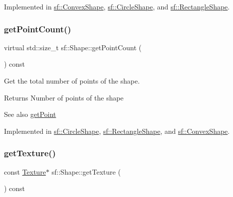 Implemented in \mbox{\hyperlink{classsf_1_1_convex_shape_a72a97bc426d8daf4d682a20fcb7f3fe7}{sf\+::\+Convex\+Shape}}, \mbox{\hyperlink{classsf_1_1_circle_shape_a2d7f9715502b960b92387102fddb8736}{sf\+::\+Circle\+Shape}}, and \mbox{\hyperlink{classsf_1_1_rectangle_shape_a3909f1a1946930ff5ae17c26206c0f81}{sf\+::\+Rectangle\+Shape}}.

\mbox{\label{classsf_1_1_shape_af988dd61a29803fc04d02198e44b5643}} 
\subsubsection{\texorpdfstring{getPointCount()}{getPointCount()}}
{\footnotesize\ttfamily virtual std\+::size\+\_\+t sf\+::\+Shape\+::get\+Point\+Count (\begin{DoxyParamCaption}{ }\end{DoxyParamCaption}) const\hspace{0.3cm}{\ttfamily [pure virtual]}}



Get the total number of points of the shape. 

\begin{DoxyReturn}{Returns}
Number of points of the shape
\end{DoxyReturn}
\begin{DoxySeeAlso}{See also}
\mbox{\hyperlink{classsf_1_1_shape_a40e5d83713eb9f0c999944cf96458085}{get\+Point}} \begin{DoxyVerb}\end{DoxyVerb}
 
\end{DoxySeeAlso}


Implemented in \mbox{\hyperlink{classsf_1_1_circle_shape_a014d29ec11e8afa4dce50e7047d99601}{sf\+::\+Circle\+Shape}}, \mbox{\hyperlink{classsf_1_1_rectangle_shape_adfb2f429e5720c9ccdb26d5996c3ae33}{sf\+::\+Rectangle\+Shape}}, and \mbox{\hyperlink{classsf_1_1_convex_shape_a0c54b8d48fe4e13414f6e667dbfc22a3}{sf\+::\+Convex\+Shape}}.

\mbox{\label{classsf_1_1_shape_a06682d37fd38d8fad56afdd5228b6951}} 
\subsubsection{\texorpdfstring{getTexture()}{getTexture()}}
{\footnotesize\ttfamily const \mbox{\hyperlink{classsf_1_1_texture}{Texture}}$\ast$ sf\+::\+Shape\+::get\+Texture (\begin{DoxyParamCaption}{ }\end{DoxyParamCaption}) const}



